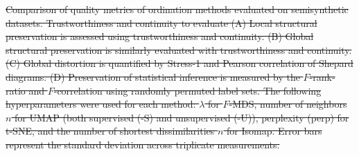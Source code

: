 \documentclass[11pt]{article}
\newcommand{\1}{{\rm 1}\kern-0.24em{\rm I}}
\providecommand{\DIFdeltex}[1]{{\protect\color{red}\sout{#1}}}                      %
\providecommand{\DIFdelbegin}{} %
\providecommand{\DIFdelend}{} %
\providecommand{\DIFdelFL}[1]{\DIFdel{#1}} %
\providecommand{\DIFdel}[1]{\texorpdfstring{\DIFdeltex{#1}}{}} %
\newcommand{\DIFscaledelfig}{0.5}
\newlength{\DIFdelgraphicswidth} %
\newlength{\DIFdelgraphicsheight} %
\newcommand{\DIFdelincludegraphics}[2][]{%
\sbox{\DIFdelgraphicsbox}{\DIFOincludegraphics[#1]{#2}}%
\settoboxwidth{\DIFdelgraphicswidth}{\DIFdelgraphicsbox} %
\settoboxtotalheight{\DIFdelgraphicsheight}{\DIFdelgraphicsbox} %
\scalebox{\DIFscaledelfig}{%
\parbox[b]{\DIFdelgraphicswidth}{\usebox{\DIFdelgraphicsbox}\\[-\baselineskip] \rule{\DIFdelgraphicswidth}{0em}}\llap{\resizebox{\DIFdelgraphicswidth}{\DIFdelgraphicsheight}{%
\setlength{\unitlength}{\DIFdelgraphicswidth}%
\begin{picture}(1,1)%
\thicklines\linethickness{2pt} %
{\color[rgb]{1,0,0}\put(0,0){\framebox(1,1){}}}%
{\color[rgb]{1,0,0}\put(0,0){\line( 1,1){1}}}%
{\color[rgb]{1,0,0}\put(0,1){\line(1,-1){1}}}%
\end{picture}%
}\hspace*{3pt}}} %
} %
\DeclareRobustCommand{\DIFdelbegin}{\DIFOdelbegin \let\includegraphics\DIFdelincludegraphics} %
\DeclareRobustCommand{\DIFdelend}{\DIFOaddend \let\includegraphics\DIFOincludegraphics} %
\begin{document}
\DIFdelbegin %
{%
\DIFdelFL{Comparison of quality metrics of ordination methods evaluated on semisynthetic datasets. Trustworthiness and continuity to evaluate (A) Local structural preservation is assessed using trustworthiness and continuity. (B) Global structural preservation is similarly evaluated with trustworthiness and continuity. (C) Global distortion is quantified by Stress-1 and Pearson correlation of Shepard diagrams. (D) Preservation of statistical inference is measured by the $F$-rank-ratio and $F$-correlation using randomly permuted label sets. The following hyperparameters were used for each method: $\lambda$ for $F$-MDS, number of neighbors $n$ for UMAP (both supervised (-S) and unsupervised (-U)), perplexity (perp) for t-SNE, and the number of shortest dissimilarities $n$ for Isomap. Error bars represent the standard deviation across triplicate measurements.}}
\DIFdelend %
\end{document}
